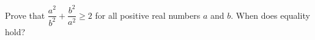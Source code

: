 Prove that $\dfrac{a^2}{b^2}+\dfrac{b^2}{a^2}\ge2$ for all positive real numbers $a$ and $b$. When does equality hold?
